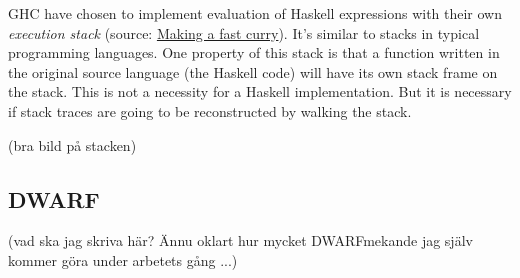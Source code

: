 GHC have chosen to implement evaluation of Haskell expressions
with their own \emph{execution stack}
(source: \href{http://community.haskell.org/~simonmar/papers/evalapplyjfp06.pdf}{Making a fast curry}).
It's similar to stacks in typical programming languages. One property of this
stack is that a function written in the original source language (the Haskell
code) will have its own stack frame on the stack. This is not a
necessity for a Haskell implementation. But it is necessary if stack traces are
going to be reconstructed by walking the stack.

(bra bild på stacken)

\subsection{DWARF}

(vad ska jag skriva här? Ännu oklart hur mycket DWARFmekande jag själv kommer
göra under arbetets gång ...)
